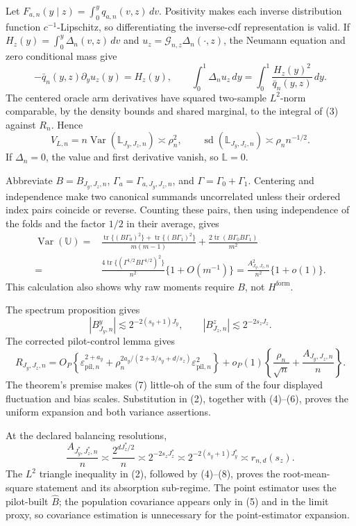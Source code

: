 Let \(F_{a,n}(y\mid z)=\int_0^yq_{a,n}(v,z)\,dv\).  Positivity makes each inverse distribution function \(c^{-1}\)-Lipschitz, so differentiating the inverse-cdf representation is valid.  If \(H_z(y)=\int_0^y\Delta_n(v,z)\,dv\) and \(u_z=\mathcal G_{n,z}\Delta_n(\cdot,z)\), the Neumann equation and zero conditional mass give
\[
-\bar q_n(y,z)\partial_yu_z(y)=H_z(y),
\qquad
\int_0^1\Delta_nu_z\,dy=\int_0^1\frac{H_z(y)^2}{\bar q_n(y,z)}\,dy.       \tag{3}
\]
The centered oracle arm derivatives have squared two-sample \(L^2\)-norm comparable, by the density bounds and shared marginal, to the integral of (3) against \(R_n\).  Hence
\[
V_{L,n}=n\operatorname{Var}(\mathbb L_{J_y,J_z,n})\asymp\rho_n^2,
\qquad
\operatorname{sd}(\mathbb L_{J_y,J_z,n})\asymp\rho_n n^{-1/2}.          \tag{4}
\]
If \(\Delta_n=0\), the value and first derivative vanish, so \(\mathbb L=0\).

Abbreviate \(B=B_{J_y,J_z,n}\), \(\Gamma_a=\Gamma_{a,J_y,J_z,n}\), and \(\Gamma=\Gamma_0+\Gamma_1\).  Centering and independence make two canonical summands uncorrelated unless their ordered index pairs coincide or reverse.  Counting these pairs, then using independence of the folds and the factor \(1/2\) in their average, gives
\[
\begin{split}
\operatorname{Var}(\mathbb U)
={}&\frac{\operatorname{tr}\{(B\Gamma_0)^2\}+\operatorname{tr}\{(B\Gamma_1)^2\}}{m(m-1)}
+\frac{2\operatorname{tr}(B\Gamma_0B\Gamma_1)}{m^2}\\
={}&\frac{4\operatorname{tr}\{(\Gamma^{1/2}B\Gamma^{1/2})^2\}}{n^2}\{1+O(m^{-1})\}
=\frac{A_{J_y,J_z,n}^2}{n^2}\{1+o(1)\}.
\end{split}\tag{5}
\]
This calculation also shows why raw moments require \(B\), not \(H^{\mathrm{form}}\).

The spectrum proposition gives
\[
|B^y_{J_y,n}|\lesssim2^{-2(s_y+1)J_y},
\qquad |B^z_{J_z,n}|\lesssim2^{-2s_zJ_z}.                                \tag{6}
\]
The corrected pilot-control lemma gives
\[
R_{J_y,J_z,n}
=O_P\!\left\{\varepsilon_{\mathrm{pil},n}^{2+a_y}+
\rho_n^{2a_y/(2+3/s_y+d/s_z)}\varepsilon_{\mathrm{pil},n}^2\right\}
+o_P(1)\left\{\frac{\rho_n}{\sqrt n}+\frac{A_{J_y,J_z,n}}n\right\}.   \tag{7}
\]
The theorem's premise makes (7) little-oh of the sum of the four displayed fluctuation and bias scales.  Substitution in (2), together with (4)--(6), proves the uniform expansion and both variance assertions.

At the declared balancing resolutions,
\[
\frac{A_{J_y^*,J_z^*,n}}n
\asymp\frac{2^{dJ_z^*/2}}n
\asymp2^{-2s_zJ_z^*}
\asymp2^{-2(s_y+1)J_y^*}
\asymp r_{n,d}(s_z).                                                       \tag{8}
\]
The \(L^2\) triangle inequality in (2), followed by (4)--(8), proves the root-mean-square statement and its absorption sub-regime.  The point estimator uses the pilot-built \(\widehat B\); the population covariance appears only in (5) and in the limit proxy, so covariance estimation is unnecessary for the point-estimator expansion.